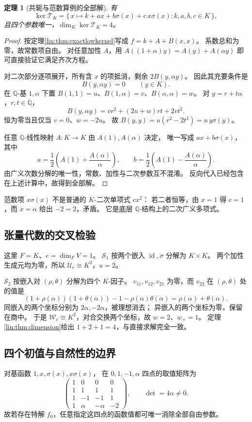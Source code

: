 \documentclass[11pt,a4paper,oneside,openany]{book}
\theoremstyle{lecture}
\newtheorem{theorem}{定理}[section]
\newcommand{\Q}{\mathbb Q}
\newcommand{\id}{\operatorname{id}}
\newcommand{\T}{\mathcal T}
\newcommand{\Uc}{\mathscr U_c}
\newcommand{\Wc}{\mathscr W_c}
\numberwithin{equation}{section}
\begin{document}
\begin{theorem}[共轭与范数算例的全部解]\label{lin:thm:normkernel}
有
\[
 \ker\T_K
 =\{\,x\mapsto k+ax+b\sigma(x)+c\,x\sigma(x):
 k,a,b,c\in K\,\},
\]
且四个参数唯一，$\dim_K\ker\T_K=4$。
\end{theorem}
\begin{proof}
按定理\ref{lin:thm:exactlowkernel}写成 $f=k+A+B(x,x)$。
系数总和为零，故常数项自由。
对任意加性 $A$，用
$A((1+\alpha)y)=A(y)+A(\alpha y)$
即可直接验证它满足齐次方程。

对二次部分逐项展开，所有含 $x$ 的项抵消，剩余
$2B(y,\alpha y)$。
因此其充要条件是
\[
 B(y,\alpha y)=0\qquad(y\in K).
\]
在 $\Q$-基 $1,\alpha$ 下置
$B(1,1)=u$、$B(1,\alpha)=v$、$B(\alpha,\alpha)=w$。
对 $y=r+t\alpha$，$r,t\in\Q$，
\[
 B(y,\alpha y)=v r^2+(2u+w)rt+2v t^2.
\]
恒为零当且仅当 $v=0$、$w=-2u$。
故 $B(y,y)=u(r^2-2t^2)=u\,y\sigma(y)$。

任意 $\Q$-线性映射 $A:K\to K$ 由 $A(1),A(\alpha)$ 决定，
唯一写成 $ax+b\sigma(x)$，其中
\[
 a=\frac12\left(A(1)+\frac{A(\alpha)}{\alpha}\right),\qquad
 b=\frac12\left(A(1)-\frac{A(\alpha)}{\alpha}\right).
\]
由广义次数分解的唯一性，常数、加性与二次参数互不混淆。
反向代入已经包含在上述计算中，故得到全部解。
\end{proof}

范数项 $x\sigma(x)$ 不是普通的 $K$-二次单项式 $cx^2$：
若二者恒等，由 $x=1$ 得 $c=1$，而 $x=\alpha$ 给出 $-2=2$，矛盾。
它是底层 $\Q$-结构上的二次广义多项式。

\subsection{张量代数的交叉检验}
这里 $F=K$、$e=\dim_FV=1$。
$\mathscr S_1$ 按两个嵌入 $\id,\sigma$ 分解为 $K\times K$。
两个加性生成元均为零，所以 $\Uc\cong K^2$，$u=2$。

$\mathscr S_2$ 按嵌入对 $(\rho,\theta)$ 分解为四个 $K$-因子。
$v_{11},v_{12},v_{21}$ 为零，而 $v_{22}$ 在 $(\rho,\theta)$ 处的值是
\[
 (1+\rho(\alpha))(1+\theta(\alpha))
 -1-\rho(\alpha)\theta(\alpha)
 =\rho(\alpha)+\theta(\alpha).
\]
同嵌入的两个坐标分别为 $2\alpha,-2\alpha$，被理想消去；
异嵌入的两个坐标为零，保留在商中。
于是 $\Wc\cong K^2$，对合交换两个坐标，故 $w=2$、$w_+=1$。
定理\ref{lin:thm:dimension}给出
$1+2+1=4$，与直接求解完全一致。

\subsection{四个初值与自然性的边界}
对基函数 $1,x,\sigma(x),x\sigma(x)$，
在 $0,1,-1,\alpha$ 四点的取值矩阵为
\[
 \begin{pmatrix}
 1&0&0&0\\
 1&1&1&1\\
 1&-1&-1&1\\
 1&\alpha&-\alpha&-2
 \end{pmatrix},
 \qquad\det=4\alpha\ne0.
\]
故若存在特解 $f_0$，任意指定这四点的函数值都可唯一消除全部自由参数。
\end{document}
